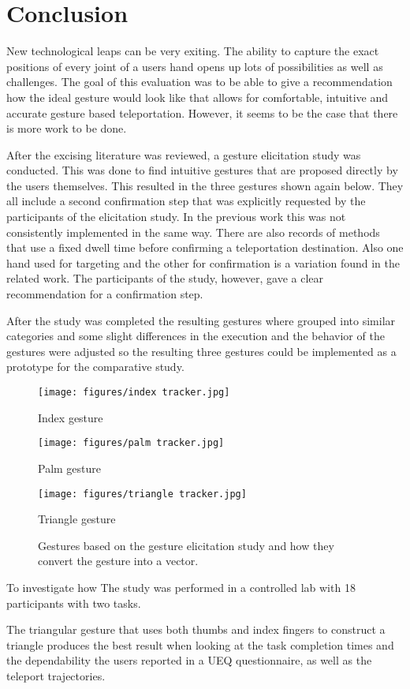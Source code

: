 \chapter{Conclusion}

New technological leaps can be very exiting. The ability to capture the exact positions of every joint of a users hand opens up lots of possibilities as well as challenges. The goal of this evaluation was to be able to give a recommendation how the ideal gesture would look like that allows for comfortable, intuitive and accurate gesture based teleportation. However, it seems to be the case that there is more work to be done. 

After the excising literature was reviewed, a gesture elicitation study was conducted. This was done to find intuitive gestures that are proposed directly by the users themselves. This resulted in the three gestures shown again below. They all include a second confirmation step that was explicitly requested by the participants of the elicitation study. In the previous work this was not consistently implemented in the same way. There are also records of methods that use a fixed dwell time before confirming a teleportation destination. Also one hand used for targeting and the other for confirmation is a variation found in the related work. The participants of the study, however, gave a clear recommendation for a confirmation step. 

After the study was completed the resulting gestures where grouped into similar categories and some slight differences in the execution and the behavior of the gestures were adjusted so the resulting three gestures could be implemented as a prototype for the comparative study. 

\begin{figure}[!h]
        \texttt{[image: figures/index tracker.jpg]}
        \caption{Index gesture}
    \endminipage\hfill
        \texttt{[image: figures/palm tracker.jpg]}
        \caption{Palm gesture}
    \endminipage
        \texttt{[image: figures/triangle tracker.jpg]}
        \caption{Triangle gesture}
    \endminipage
    \hfill
    \caption{Gestures based on the gesture elicitation study and how they convert the gesture into a vector.}
\end{figure}

To investigate how  The study was performed in a controlled lab with 18 participants with two tasks. 

The triangular gesture that uses both thumbs and index fingers to construct a triangle produces the best result when looking at the task completion times and the dependability the users reported in a UEQ questionnaire, as well as the teleport trajectories. 
